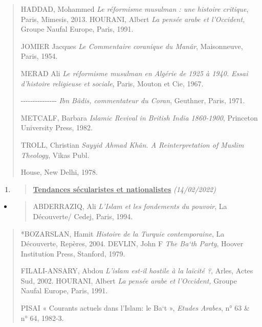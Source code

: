 \begin{quote}
HADDAD, Mohammed \emph{Le réformisme musulman : une histoire critique},
Paris, Mimesis, 2013. HOURANI, Albert \emph{La pensée arabe et
l'Occident,} Groupe Naufal Europe, Paris, 1991.

JOMIER Jacques \emph{Le Commentaire coranique du Manâr}, Maisonneuve,
Paris, 1954.

MERAD Ali \emph{Le réformisme musulman en Algérie de 1925 à 1940. Essai
d'histoire religieuse et sociale}, Paris, Mouton et Cie, 1967.

-\/-\/-\/-\/-\/-\/-\/-\/-\/-\/-\/-\/-\/-\/- \emph{Ibn Bâdis,
commentateur du Coran}, Geuthner, Paris, 1971.

METCALF, Barbara \emph{Islamic Revival in British India 1860-1900},
Princeton University Press, 1982.

TROLL, Christian \emph{Sayyid Ahmad Khân. A Reinterpretation of Muslim
Theology}, Vikas Publ.

House, New Delhi, 1978.
\end{quote}

\begin{enumerate}
\def\labelenumi{\arabic{enumi}.}
\item
  \begin{quote}
  \textbf{\underline{Tendances sécularistes et nationalistes}}
  \emph{(14/02/2022)}
  \end{quote}
\end{enumerate}

\begin{itemize}
\item
  \begin{quote}
  ABDERRAZIQ, Ali \emph{L'Islam et les fondements du pouvoir}, La
  Découverte/ Cedej, Paris, 1994.
  \end{quote}
\end{itemize}

\begin{quote}
*BOZARSLAN, Hamit \emph{Histoire de la Turquie contemporaine}, La
Découverte, Repères, 2004. DEVLIN, John F \emph{The Ba`th Party}, Hoover
Institution Press, Stanford, 1979.

FILALI-ANSARY, Abdou \emph{L'islam est-il hostile à la laïcité ?},
Arles, Actes Sud, 2002. HOURANI, Albert \emph{La pensée arabe et
l'Occident,} Groupe Naufal Europe, Paris, 1991.

PISAI « Courants actuels dans l'Islam: le Ba`t », \emph{Etudes Arabes},
n° 63 \& n° 64, 1982-3.
\end{quote}

